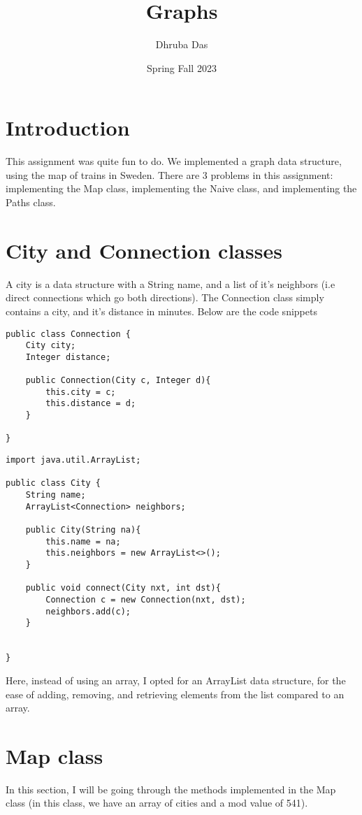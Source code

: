 \documentclass[a4paper,11pt]{article}
\begin{document}
\title{
    \textbf{Graphs}
}
\author{Dhruba Das}
\date{Spring Fall 2023}

\maketitle

\section*{Introduction}
This assignment was quite fun to do. We implemented a graph data structure, using the map of trains in Sweden. There are 3 problems in this assignment: implementing the Map class, implementing the Naive class, and implementing the Paths class. 

\section*{City and Connection classes}
A city is a data structure with a String name, and a list of it's neighbors (i.e direct connections which go both directions). The Connection class simply contains a city, and it's distance in minutes. Below are the code snippets

\begin{verbatim}
public class Connection {
    City city;
    Integer distance;
    
    public Connection(City c, Integer d){
        this.city = c;
        this.distance = d;
    }

}
\end{verbatim}

\begin{verbatim}
import java.util.ArrayList;

public class City {
    String name;
    ArrayList<Connection> neighbors;

    public City(String na){
        this.name = na;
        this.neighbors = new ArrayList<>();
    }

    public void connect(City nxt, int dst){
        Connection c = new Connection(nxt, dst);
        neighbors.add(c);
    }


}
\end{verbatim}
Here, instead of using an array, I opted for an ArrayList data structure, for the ease of adding, removing, and retrieving elements from the list compared to an array.


\section*{Map class}
In this section, I will be going through the methods implemented in the Map class (in this class, we have an array of cities and a mod value of 541).
\end{document}
